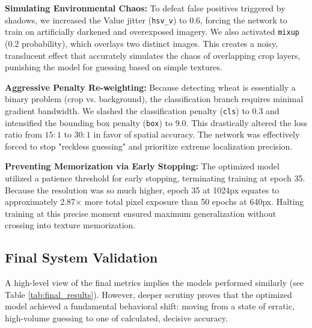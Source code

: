 \textbf{Simulating Environmental Chaos:} 
To defeat false positives triggered by shadows, we increased the Value jitter (\texttt{hsv\_v}) to 0.6, forcing the network to train on artificially darkened and overexposed imagery. We also activated \texttt{mixup} (0.2 probability), which overlays two distinct images. This creates a noisy, translucent effect that accurately simulates the chaos of overlapping crop layers, punishing the model for guessing based on simple textures.

\textbf{Aggressive Penalty Re-weighting:} 
Because detecting wheat is essentially a binary problem (crop vs. background), the classification branch requires minimal gradient bandwidth. We slashed the classification penalty (\texttt{cls}) to 0.3 and intensified the bounding box penalty (\texttt{box}) to 9.0. This drastically altered the loss ratio from $15:1$ to $30:1$ in favor of spatial accuracy. The network was effectively forced to stop "reckless guessing" and prioritize extreme localization precision.

\textbf{Preventing Memorization via Early Stopping:} 
The optimized model utilized a patience threshold for early stopping, terminating training at epoch 35. Because the resolution was so much higher, epoch 35 at 1024px equates to approximately 2.87$\times$ more total pixel exposure than 50 epochs at 640px. Halting training at this precise moment ensured maximum generalization without crossing into texture memorization.

\subsection{Final System Validation}
\label{subsec:final_results}

A high-level view of the final metrics implies the models performed similarly (see Table \ref{tab:final_results}). However, deeper scrutiny proves that the optimized model achieved a fundamental behavioral shift: moving from a state of erratic, high-volume guessing to one of calculated, decisive accuracy. 

\begin{table}[h]
\centering
\caption{Validation Metrics Comparison. The optimized model dramatically improved its median confidence threshold.}
\label{tab:final_results}
\end{table}

